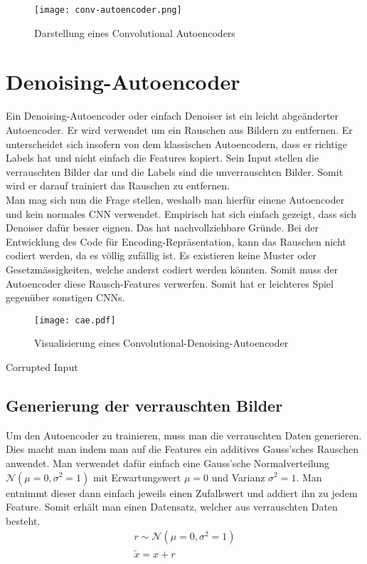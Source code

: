 \begin{figure}[h!]
  \centering
  \texttt{[image: conv-autoencoder.png]}
  \caption{Darstellung eines Convolutional Autoencoders}
\end{figure}


\cite{yt:autoencoder_faces}

\section{Denoising-Autoencoder}
Ein Denoising-Autoencoder oder einfach Denoiser ist ein leicht abgeänderter
Autoencoder. Er wird verwendet um ein Rauschen aus Bildern zu entfernen.
\para{}
Er unterscheidet sich insofern von dem klassischen Autoencodern, dass er
richtige Labels hat und nicht einfach die Features kopiert. Sein Input stellen
die verrauschten Bilder dar und die Labels sind die unverrauschten Bilder. Somit
wird er darauf trainiert das Rauschen zu entfernen. \\
Man mag sich nun die Frage stellen, weshalb man hierfür einene Autoencoder und
kein normales CNN verwendet. Empirisch hat sich einfach gezeigt, dass sich
Denoiser dafür besser eignen. Das hat nachvollziehbare Gründe. Bei der
Entwicklung des Code für Encoding-Repräsentation, kann das Rauschen nicht
codiert werden, da es völlig zufällig ist. Es existieren keine Muster oder
Gesetzmässigkeiten, welche anderst codiert werden könnten. Somit muss der
Autoencoder diese Rausch-Features verwerfen. Somit hat er leichteres Spiel
gegenüber sonstigen CNNs.

\begin{figure}[h!]
  \centering
  \texttt{[image: cae.pdf]}
  \caption{Visualisierung eines Convolutional-Denoising-Autoencoder}
\end{figure}


Corrupted Input
\subsection{Generierung der verrauschten Bilder}
Um den Autoencoder zu trainieren, muss man die verrauschten Daten generieren.
Dies macht man indem man auf die Features ein additives Gauss'sches Rauschen anwendet.
Man verwendet dafür einfach eine Gauss'sche Normalverteilung
$\mathcal{N}(\mu = 0, \sigma^2 = 1)$ mit Erwartungswert $\mu = 0$ und Varianz
$\sigma^2 = 1$. Man entnimmt dieser dann einfach jeweils einen Zufallswert und
addiert ihn zu jedem Feature. Somit erhält man einen Datensatz, welcher aus
verrauschten Daten besteht.
\begin{gather*}
  r \sim \mathcal{N}(\mu = 0, \sigma^2 = 1) \\
  \tilde{x} = x + r
\end{gather*}


